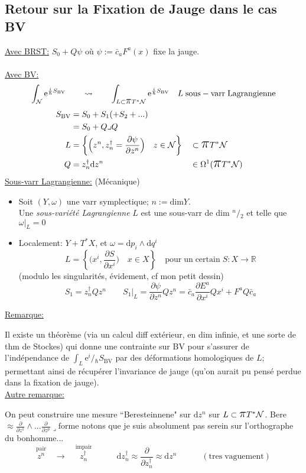 \documentclass[a4paper,11pt]{article}
\renewcommand{\d}{{\mathrm{d}}}
\newcommand{\e}{{\mathrm{e}}}
\newcommand{\dr}[2]{\frac{\partial {#1}}{\partial{#2}}}
\newcommand{\ppi}{{\mathlarger{\mathlarger{\mathlarger{\pi}}}}}
\begin{document}
\subsection{Retour sur la Fixation de Jauge dans le cas BV}
\underline{Avec BRST:} \quad $S_0 + Q\psi$ où $\psi:=\bar c_a F^a(x)$ fixe la jauge.\\\\
\underline{Avec BV:}
$$\int_\mathcal{N} \e^{\frac i\hbar S_\mathrm{BV}} \quad\quad\rightsquigarrow\quad\quad
\int_{L\subset \ppi T^*\mathcal{N}} \e^{\frac i\hbar S_\mathrm{BV}} \quad L\; \mathrm{sous}-\mathrm{varr}\;\mathrm{Lagrangienne}$$
\begin{align*}
S_\mathrm{BV} &= S_0 + S_1 (+S_2 +...)\\
&= S_0 + Q \lrcorner Q\\
L &= \left\{\Big(z^n, z_n^\dag= \dr\psi{z^n}\Big) \quad z \in \mathcal{N} \right\} && \subset \ppi T^*\mathcal{N}\\
Q &= z_n^\dag\d z^n &&\in \Omega^1(\ppi T^*\mathcal N)
\end{align*}
\underline{Sous-varr Lagrangienne:} (Mécanique)
\begin{itemize}
\item Soit $(Y,\omega)$ une varr symplectique; $n:= \mathrm{dim} Y$.\\
Une \emph{sous-variété Lagrangienne} $L$ est une sous-varr de dim $^n\!/\!_2$ et telle que $\omega|_L=0$
\item Localement: $Y + T^* X$, et $\omega = \d p_i \wedge \d q^i$
$$L = \left\{\Big(x^i,\dr S{x^i}\Big)\quad x\in X\right\} \quad \mathrm{pour}\;\mathrm{un}\;\mathrm{certain}\; S:X\to\mathbb{R}$$
(modulo les singularités, évidement, cf \color{red} mon petit dessin\color{black})
$$S_1 = z_n^\dag Q z^n \quad\quad S_1|_L = \dr \psi{z^n} Q z^n = \bar c_a \dr{E^a}{x^i} Q x^i + F^aQ \bar c_a$$
\end{itemize}
\underline{Remarque:}

Il existe un théorème (via un calcul diff extérieur, en dim infinie, et une sorte de thm de Stockes) qui donne une contrainte sur BV pour s'assurer de l'indépendance de $\int_L \e{^i\!/\!_\hbar S_\mathrm{BV}}$ par des déformations homologiques de $L$; permettant ainsi de récupérer l'invariance de jauge (qu'on aurait pu pensé perdue dans la fixation de jauge).\\

\noindent\underline{Autre remarque:}

On peut construire une mesure ``Beresteinnene" sur $\d z^n$ sur $L \subset \ppi T^*\mathcal{N}$.  Bere $\approx \dr{}{z^1}\wedge...\dr{}{z^p}\lrcorner \mathrm{forme}$ \color{red} notons que je suis absolument pas serein sur l'orthographe du bonhomme...\color{black}
$$\overset{\mathrm{pair}}{z^n} \quad \longrightarrow\quad \overset{\mathrm{impair}}{z^\dag_n}\quad \quad \quad \d z^\dag_n\approx\dr{}{z_n^\dag}\approx\d z^n
\quad \quad \quad (\mathrm{tres}\;\mathrm{vaguement})$$
\end{document}
